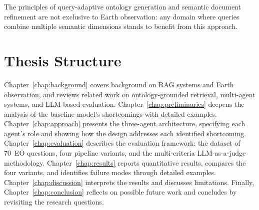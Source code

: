 The principles of query-adaptive ontology generation and semantic document refinement
are not exclusive to Earth observation: any domain where queries combine multiple
semantic dimensions stands to benefit from this approach.

\section{Thesis Structure}
\label{sec:structure}

Chapter~\ref{chap:background} covers background on RAG systems and Earth observation, and reviews related work on ontology-grounded retrieval, multi-agent systems, and LLM-based evaluation. Chapter~\ref{chap:preliminaries} deepens the analysis of the baseline model's shortcomings with detailed examples. Chapter~\ref{chap:approach} presents the three-agent architecture, specifying each agent's role and showing how the design addresses each identified shortcoming. Chapter~\ref{chap:evaluation} describes the evaluation framework: the dataset of 70~EO questions, four pipeline variants, and the multi-criteria LLM-as-a-judge methodology. Chapter~\ref{chap:results} reports quantitative results, compares the four variants, and identifies failure modes through detailed examples. Chapter~\ref{chap:discussion} interprets the results and discusses limitations. Finally, Chapter~\ref{chap:conclusion} reflects on possible future work and concludes by revisiting the research questions.
